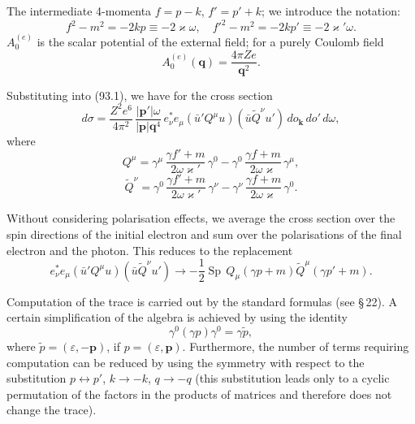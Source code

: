 The intermediate 4-momenta $f = p - k$, $f' = p' + k$; we introduce the notation:
\begin{equation}
f^2 - m^2 = -2kp \equiv -2\varkappa\omega, \quad f'^2 - m^2 = -2kp' \equiv -2\varkappa'\omega.
\label{eq:93.4}
\end{equation}
$A_0^{(e)}$ is the scalar potential of the external field; for a purely Coulomb field
\begin{equation}
A_0^{(e)}(\mathbf{q}) = \frac{4\pi Ze}{\mathbf{q}^2}.
\label{eq:93.5}
\end{equation}


Substituting into (93.1), we have for the cross section
\begin{equation}
d\sigma = \frac{Z^2 e^6}{4\pi^2}\,\frac{|\mathbf{p}'|\omega}{|\mathbf{p}|\mathbf{q}^4}\,e_\nu^* e_\mu(\bar{u}'Q^\mu u)(\bar{u}\widetilde{Q}^\nu u')\,do_\mathbf{k}\,do'\,d\omega,
\label{eq:93.6}
\end{equation}
where
\[
Q^\mu = \gamma^\mu\,\frac{\gamma f'+m}{2\omega\varkappa'}\,\gamma^0 - \gamma^0\,\frac{\gamma f+m}{2\omega\varkappa}\,\gamma^\mu,
\]
\[
\widetilde{Q}^\nu = \gamma^0\,\frac{\gamma f'+m}{2\omega\varkappa'}\,\gamma^\nu - \gamma^\nu\,\frac{\gamma f+m}{2\omega\varkappa}\,\gamma^0.
\]

Without considering polarisation effects, we average the cross section over the spin directions of the initial electron and sum over the polarisations of the final electron and the photon. This reduces to the replacement
\[
e_\nu^* e_\mu(\bar{u}'Q^\mu u)(\bar{u}\widetilde{Q}^\nu u') \to -\frac{1}{2}\operatorname{Sp}\,Q_\mu(\gamma p + m)\widetilde{Q}^\mu(\gamma p' + m).
\]

Computation of the trace is carried out by the standard formulas (see \S\,22). A certain simplification of the algebra is achieved by using the identity
\[
\gamma^0(\gamma p)\gamma^0 = \gamma\tilde{p},
\]
where $\tilde{p} = (\varepsilon, -\mathbf{p})$, if $p = (\varepsilon, \mathbf{p})$. Furthermore, the number of terms requiring computation can be reduced by using the symmetry with respect to the substitution $p \leftrightarrow p'$, $k \to -k$, $q \to -q$ (this substitution leads only to a cyclic permutation of the factors in the products of matrices and therefore does not change the trace).

